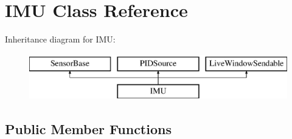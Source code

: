 \hypertarget{class_i_m_u}{}\section{I\+M\+U Class Reference}
\label{class_i_m_u}
Inheritance diagram for I\+M\+U\+:\begin{figure}[H]
\begin{center}
\leavevmode
\includegraphics[height=2.000000cm]{class_i_m_u}
\end{center}
\end{figure}
\subsection*{Public Member Functions}
